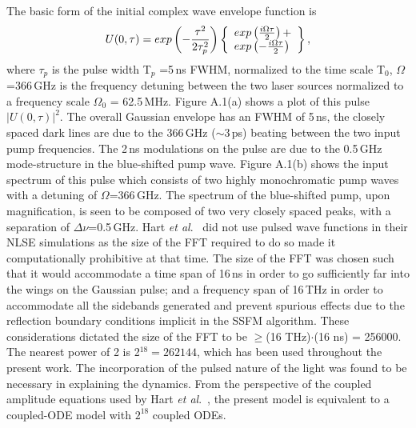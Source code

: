 The basic form of the initial complex wave envelope function is
\begin {equation}
U(0,\tau) = exp \left( - {\tau^2 \over 2\tau_p^2} \right)
\left\{
\begin{array}{l}
exp\left( {i\Omega\tau \over 2} \right) + \\
exp\left( - {i\Omega\tau \over 2} \right)
\end{array}
\right\} ,
\end{equation}
where $\tau_p$ is the pulse width T$_p$ =5\,ns FWHM, normalized to the time scale
T$_0$, $\Omega$=366\,GHz is the frequency detuning between the two laser
sources normalized to a frequency scale $\Omega_0$ = 62.5\,MHz.  Figure A.1(a)
shows a plot of this pulse $|U(0,\tau)|^2$. The overall Gaussian envelope
has an FWHM of 5\,ns, the closely spaced dark lines are due to the 366\,GHz
($\sim$3\,ps) beating between the two input pump frequencies. The 2\,ns
modulations on the pulse are due to the 0.5\,GHz mode-structure in the
blue-shifted pump wave. Figure A.1(b) shows the input spectrum of this pulse
which consists of two highly monochromatic pump waves with a detuning of
$\Omega$=366\,GHz. The spectrum of the blue-shifted pump, upon magnification,
is seen to be composed of two very closely spaced peaks, with a separation of
$\Delta\nu$=0.5\,GHz. Hart {\it et al}.\ \cite{hart1} did not use pulsed
wave functions in their NLSE simulations as the size of the FFT required to do
so made it computationally prohibitive at that time. The size of the FFT was
chosen such that it would accommodate a time span of 16\,ns in order to go
sufficiently far into the wings on the Gaussian pulse; and a frequency span of
16\,THz in order to accommodate all the sidebands generated and prevent
spurious effects due to the reflection boundary conditions implicit in the
SSFM algorithm. These considerations dictated the size of the FFT to be
$\geq$(16 THz)$\cdot$(16 ns) = 256000. The nearest power of 2 is
2$^{18} = 262144$, which has been used throughout the present work. The
incorporation of the pulsed nature of the light was found to be necessary in
explaining the dynamics. From the perspective of the coupled amplitude
equations used by Hart {\it et al}.\ \cite{hart1}, the present model is equivalent
to a coupled-ODE model with $2^{18}$ coupled ODEs.


